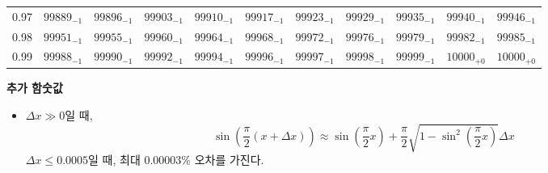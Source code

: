 \documentclass[10pt, a4paper]{article}
\begin{document}
\begin{center}
\begin{longtable}{c || c c c c c | c c c c c}
        0.97 & \({99889}_{-1}\) & \({99896}_{-1}\) & \({99903}_{-1}\) & \({99910}_{-1}\) & \({99917}_{-1}\) & \({99923}_{-1}\) & \({99929}_{-1}\) & \({99935}_{-1}\) & \({99940}_{-1}\) & \({99946}_{-1}\)\\
        0.98 & \({99951}_{-1}\) & \({99955}_{-1}\) & \({99960}_{-1}\) & \({99964}_{-1}\) & \({99968}_{-1}\) & \({99972}_{-1}\) & \({99976}_{-1}\) & \({99979}_{-1}\) & \({99982}_{-1}\) & \({99985}_{-1}\)\\
        0.99 & \({99988}_{-1}\) & \({99990}_{-1}\) & \({99992}_{-1}\) & \({99994}_{-1}\) & \({99996}_{-1}\) & \({99997}_{-1}\) & \({99998}_{-1}\) & \({99999}_{-1}\) & \({10000}_{+0}\) & \({10000}_{+0}\)\\
        \hline
    \end{longtable}
    \textbf{추가 함숫값}
    \begin{itemize}
        \item \(\Delta x \gg 0\)일 때, 
        \[\sin\left(\frac{\pi}{2}\left(x+\Delta x\right)\right) \approx 
        \sin{\left(\frac{\pi}{2}x\right)} + \frac{\pi}{2}\sqrt{1-\sin^{2}\left(\frac{\pi}{2}x\right)}\Delta x\]
        \(\Delta x \leq 0.0005\)일 때, 최대 \(0.00003\)\% 오차를 가진다. 
    \end{itemize}
\end{center}
\pagebreak
\end{document}
